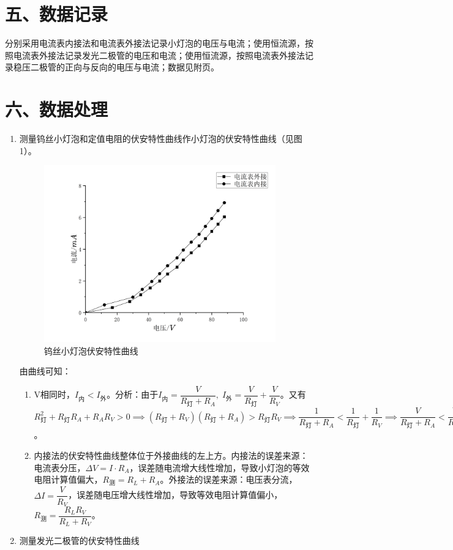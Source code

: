 \documentclass[11pt]{article}
\begin{document}
\section*{五、数据记录}

分别采用电流表内接法和电流表外接法记录小灯泡的电压与电流；使用恒流源，按照电流表外接法记录发光二极管的电压和电流；使用恒流源，按照电流表外接法记录稳压二极管的正向与反向的电压与电流；数据见附页。

\section*{六、数据处理}

\begin{enumerate}
    \item 测量钨丝小灯泡和定值电阻的伏安特性曲线作小灯泡的伏安特性曲线（见图1）。
    \begin{figure}[H]
        \centering
        \includegraphics[width=10cm]{Figs/Graph1.png}
        \caption{钨丝小灯泡伏安特性曲线}
    \end{figure}

    由曲线可知：
    \begin{enumerate}
        \item V相同时，$I_{\text{内}}<I_{\text{外}}$。分析：由于$I_{\text{内}}=\dfrac{V}{R_{\text{灯}}+R_A},\;I_{\text{外}}=\dfrac{V}{R_{\text{灯}}}+\dfrac{V}{R_V}$。又有$R_{\text{灯}}^2+R_{\text{灯}}R_A+R_AR_V>0 \implies (R_{\text{灯}}+R_V)(R_{\text{灯}}+R_A)>R_{\text{灯}}R_V \implies \dfrac{1}{R_{\text{灯}}+R_A}<\dfrac{1}{R_{\text{灯}}}+\dfrac{1}{R_V} \implies \dfrac{V}{R_{\text{灯}}+R_A}<\dfrac{V}{R_{\text{灯}}}+\dfrac{V}{R_V} \implies I_{\text{内}}<I_{\text{外}}$。
        \item 内接法的伏安特性曲线整体位于外接曲线的左上方。内接法的误差来源：电流表分压，$\Delta V = I \cdot R_A$，误差随电流增大线性增加，导致小灯泡的等效电阻计算值偏大，$R_{\text{测}} = R_L + R_A$。外接法的误差来源：电压表分流，$\Delta I = \dfrac{V}{R_V}$，误差随电压增大线性增加，导致等效电阻计算值偏小，$R_{\text{测}} = \dfrac{R_L R_V}{R_L + R_V}$。
    \end{enumerate}
    \item 测量发光二极管的伏安特性曲线
    

\end{enumerate}
\end{document}
